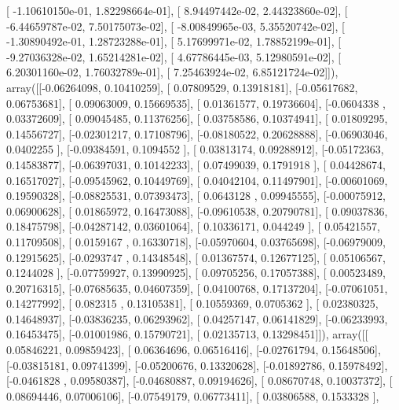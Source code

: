 \documentclass{article}
\begin{document}
       [ -1.10610150e-01,   1.82298664e-01],
       [  8.94497442e-02,   2.44323860e-02],
       [ -6.44659787e-02,   7.50175073e-02],
       [ -8.00849965e-03,   5.35520742e-02],
       [ -1.30890492e-01,   1.28723288e-01],
       [  5.17699971e-02,   1.78852199e-01],
       [ -9.27036328e-02,   1.65214281e-02],
       [  4.67786445e-03,   5.12980591e-02],
       [  6.20301160e-02,   1.76032789e-01],
       [  7.25463924e-02,   6.85121724e-02]]), array([[-0.06264098,  0.10410259],
       [ 0.07809529,  0.13918181],
       [-0.05617682,  0.06753681],
       [ 0.09063009,  0.15669535],
       [ 0.01361577,  0.19736604],
       [-0.0604338 ,  0.03372609],
       [ 0.09045485,  0.11376256],
       [ 0.03758586,  0.10374941],
       [ 0.01809295,  0.14556727],
       [-0.02301217,  0.17108796],
       [-0.08180522,  0.20628888],
       [-0.06903046,  0.0402255 ],
       [-0.09384591,  0.1094552 ],
       [ 0.03813174,  0.09288912],
       [-0.05172363,  0.14583877],
       [-0.06397031,  0.10142233],
       [ 0.07499039,  0.1791918 ],
       [ 0.04428674,  0.16517027],
       [-0.09545962,  0.10449769],
       [ 0.04042104,  0.11497901],
       [-0.00601069,  0.19590328],
       [-0.08825531,  0.07393473],
       [ 0.0643128 ,  0.09945555],
       [-0.00075912,  0.06900628],
       [ 0.01865972,  0.16473088],
       [-0.09610538,  0.20790781],
       [ 0.09037836,  0.18475798],
       [-0.04287142,  0.03601064],
       [ 0.10336171,  0.044249  ],
       [ 0.05421557,  0.11709508],
       [ 0.0159167 ,  0.16330718],
       [-0.05970604,  0.03765698],
       [-0.06979009,  0.12915625],
       [-0.0293747 ,  0.14348548],
       [ 0.01367574,  0.12677125],
       [ 0.05106567,  0.1244028 ],
       [-0.07759927,  0.13990925],
       [ 0.09705256,  0.17057388],
       [ 0.00523489,  0.20716315],
       [-0.07685635,  0.04607359],
       [ 0.04100768,  0.17137204],
       [-0.07061051,  0.14277992],
       [ 0.082315  ,  0.13105381],
       [ 0.10559369,  0.0705362 ],
       [ 0.02380325,  0.14648937],
       [-0.03836235,  0.06293962],
       [ 0.04257147,  0.06141829],
       [-0.06233993,  0.16453475],
       [-0.01001986,  0.15790721],
       [ 0.02135713,  0.13298451]]), array([[ 0.05846221,  0.09859423],
       [ 0.06364696,  0.06516416],
       [-0.02761794,  0.15648506],
       [-0.03815181,  0.09741399],
       [-0.05200676,  0.13320628],
       [-0.01892786,  0.15978492],
       [-0.0461828 ,  0.09580387],
       [-0.04680887,  0.09194626],
       [ 0.08670748,  0.10037372],
       [ 0.08694446,  0.07006106],
       [-0.07549179,  0.06773411],
       [ 0.03806588,  0.1533328 ],
\end{document}
